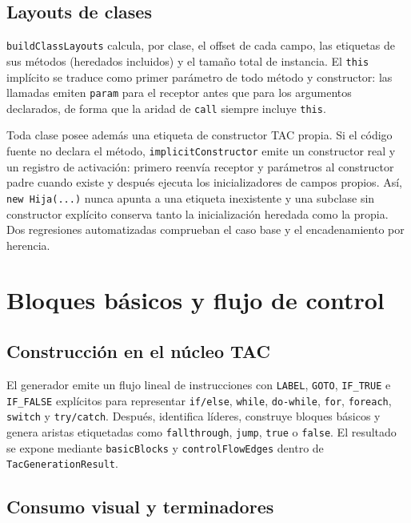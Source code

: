 \documentclass[11pt,letterpaper,oneside]{report}
\newcommand{\archivo}[1]{\path{#1}}
\newcommand{\codigo}[1]{\texttt{#1}}
\begin{document}
\section{Layouts de clases}

\codigo{buildClassLayouts} calcula, por clase, el offset de cada campo,
las etiquetas de sus métodos (heredados incluidos) y el tamaño total de instancia.
El \codigo{this} implícito se traduce como primer parámetro de todo método y
constructor: las llamadas emiten \codigo{param} para el receptor antes que para los
argumentos declarados, de forma que la aridad de \codigo{call} siempre incluye
\codigo{this}.

Toda clase posee además una etiqueta de constructor TAC propia. Si el código fuente
no declara el método, \codigo{implicitConstructor} emite un constructor real y un
registro de activación: primero reenvía receptor y parámetros al constructor padre
cuando existe y después ejecuta los inicializadores de campos propios. Así,
\codigo{new Hija(...)} nunca apunta a una etiqueta inexistente y una subclase sin
constructor explícito conserva tanto la inicialización heredada como la propia. Dos
regresiones automatizadas comprueban el caso base y el encadenamiento por herencia.

\chapter{Bloques básicos y flujo de control}

\section{Construcción en el núcleo TAC}

El generador emite un flujo lineal de instrucciones con \codigo{LABEL},
\codigo{GOTO}, \codigo{IF\_TRUE} e \codigo{IF\_FALSE} explícitos para representar
\codigo{if/else}, \codigo{while}, \codigo{do-while}, \codigo{for}, \codigo{foreach},
\codigo{switch} y \codigo{try/catch}. Después, \archivo{src/tac/controlFlow.ts}
identifica líderes, construye bloques básicos y genera aristas etiquetadas como
\codigo{fallthrough}, \codigo{jump}, \codigo{true} o \codigo{false}. El resultado se
expone mediante \codigo{basicBlocks} y \codigo{controlFlowEdges} dentro de
\codigo{TacGenerationResult}.

\section{Consumo visual y terminadores}
\end{document}
